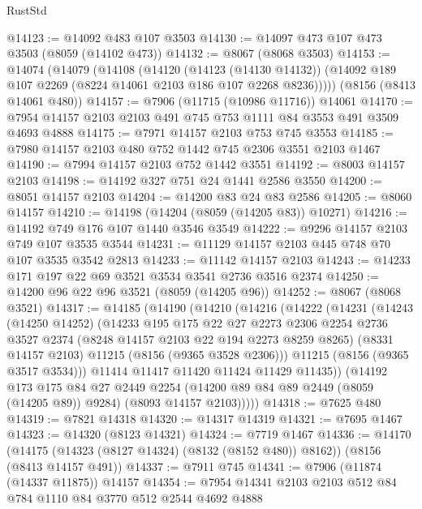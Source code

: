 \begin{lexlean}{RustStd}
\begin{coremodule}
@14123 := @14092 @483 @107 @3503
@14130 := @14097 @473 @107 @473 @3503 (@8059 (@14102 @473))
@14132 := @8067 (@8068 @3503)
@14153 := @14074
    (@14079
      (@14108
        (@14120
          (@14123 (@14130 @14132))
          (@14092 @189 @107 @2269 (@8224 @14061 @2103 @186 @107 @2268 @8236)))))
    (@8156 (@8413 @14061 @480))
@14157 := @7906 (@11715 (@10986 @11716)) @14061
@14170 := @7954 @14157 @2103 @2103 @491 @745 @753 @1111 @84 @3553 @491 @3509 @4693 @4888
@14175 := @7971 @14157 @2103 @753 @745 @3553
@14185 := @7980 @14157 @2103 @480 @752 @1442 @745 @2306 @3551 @2103 @1467
@14190 := @7994 @14157 @2103 @752 @1442 @3551
@14192 := @8003 @14157 @2103
@14198 := @14192 @327 @751 @24 @1441 @2586 @3550
@14200 := @8051 @14157 @2103
@14204 := @14200 @83 @24 @83 @2586
@14205 := @8060 @14157
@14210 := @14198 (@14204 (@8059 (@14205 @83)) @10271)
@14216 := @14192 @749 @176 @107 @1440 @3546 @3549
@14222 := @9296 @14157 @2103 @749 @107 @3535 @3544
@14231 := @11129 @14157 @2103 @445 @748 @70 @107 @3535 @3542 @2813
@14233 := @11142 @14157 @2103
@14243 := @14233 @171 @197 @22 @69 @3521 @3534 @3541 @2736 @3516 @2374
@14250 := @14200 @96 @22 @96 @3521 (@8059 (@14205 @96))
@14252 := @8067 (@8068 @3521)
@14317 := @14185
    (@14190
      (@14210
        (@14216
          (@14222
            (@14231
              (@14243
                (@14250 @14252)
                (@14233
                  @195
                  @175
                  @22
                  @27
                  @2273
                  @2306
                  @2254
                  @2736
                  @3527
                  @2374
                  (@8248 @14157 @2103 @22 @194 @2273 @8259 @8265)
                  (@8331 @14157 @2103)
                  @11215
                  (@8156 (@9365 @3528 @2306)))
                @11215
                (@8156 (@9365 @3517 @3534)))
              @11414
              @11417
              @11420
              @11424
              @11429
              @11435))
          (@14192
            @173
            @175
            @84
            @27
            @2449
            @2254
            (@14200 @89 @84 @89 @2449 (@8059 (@14205 @89)) @9284)
            (@8093 @14157 @2103)))))
@14318 := @7625 @480
@14319 := @7821 @14318
@14320 := @14317 @14319
@14321 := @7695 @1467
@14323 := @14320 (@8123 @14321)
@14324 := @7719 @1467
@14336 := @14170
    (@14175 (@14323 (@8127 @14324) (@8132 (@8152 @480)) @8162))
    (@8156 (@8413 @14157 @491))
@14337 := @7911 @745
@14341 := @7906 (@11874 (@14337 @11875)) @14157
@14354 := @7954 @14341 @2103 @2103 @512 @84 @784 @1110 @84 @3770 @512 @2544 @4692 @4888

\end{coremodule}
\end{lexlean}
